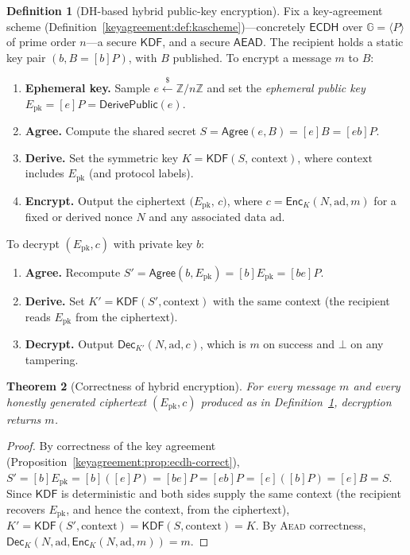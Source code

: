 \documentclass[11pt,a4paper]{article}
\newtheorem{theorem}{Theorem}[section]
\theoremstyle{definition}
\newtheorem{definition}[theorem]{Definition}
\theoremstyle{remark}
\newcommand{\Z}{\ensuremath{\mathbb{Z}}}
\newcommand{\G}{\ensuremath{\mathbb{G}}}
\begin{document}
\begin{definition}[DH-based hybrid public-key encryption]\label{keyagreement:def:hpke}
Fix a key-agreement scheme (Definition~\ref{keyagreement:def:kascheme})---concretely \(\mathsf{ECDH}\) over \(\G = \langle P\rangle\) of prime order \(n\)---a secure \(\mathsf{KDF}\), and a secure \(\mathsf{AEAD}\). The recipient holds a static key pair \((b, B = [b]P)\), with \(B\) published. To encrypt a message \(m\) to \(B\):
\begin{enumerate}
  \item \textbf{Ephemeral key.} Sample \(e \xleftarrow{\$} \Z/n\Z\) and set the \emph{ephemeral public key} \(E_{\mathrm{pk}} = [e]P = \mathsf{DerivePublic}(e)\).
  \item \textbf{Agree.} Compute the shared secret \(S = \mathsf{Agree}(e, B) = [e]B = [eb]P\).
  \item \textbf{Derive.} Set the symmetric key \(K = \mathsf{KDF}(S, \,\mathrm{context})\), where \(\mathrm{context}\) includes \(E_{\mathrm{pk}}\) (and protocol labels).
  \item \textbf{Encrypt.} Output the ciphertext \(\bigl(E_{\mathrm{pk}},\, c\bigr)\), where \(c = \mathsf{Enc}_K(N, \mathrm{ad}, m)\) for a fixed or derived nonce \(N\) and any associated data \(\mathrm{ad}\).
\end{enumerate}
To decrypt \((E_{\mathrm{pk}}, c)\) with private key \(b\):
\begin{enumerate}
  \item \textbf{Agree.} Recompute \(S' = \mathsf{Agree}(b, E_{\mathrm{pk}}) = [b]E_{\mathrm{pk}} = [be]P\).
  \item \textbf{Derive.} Set \(K' = \mathsf{KDF}(S', \mathrm{context})\) with the same context (the recipient reads \(E_{\mathrm{pk}}\) from the ciphertext).
  \item \textbf{Decrypt.} Output \(\mathsf{Dec}_{K'}(N, \mathrm{ad}, c)\), which is \(m\) on success and \(\bot\) on any tampering.
\end{enumerate}
\end{definition}

\begin{theorem}[Correctness of hybrid encryption]\label{keyagreement:thm:hpke-correct}
For every message \(m\) and every honestly generated ciphertext \((E_{\mathrm{pk}}, c)\) produced as in Definition~\ref{keyagreement:def:hpke}, decryption returns \(m\).
\end{theorem}

\begin{proof}
By correctness of the key agreement (Proposition~\ref{keyagreement:prop:ecdh-correct}), \(S' = [b]E_{\mathrm{pk}} = [b]([e]P) = [be]P = [eb]P = [e]([b]P) = [e]B = S\). Since \(\mathsf{KDF}\) is deterministic and both sides supply the same context (the recipient recovers \(E_{\mathrm{pk}}\), and hence the context, from the ciphertext), \(K' = \mathsf{KDF}(S', \mathrm{context}) = \mathsf{KDF}(S, \mathrm{context}) = K\). By \textsc{Aead} correctness, \(\mathsf{Dec}_{K}(N, \mathrm{ad}, \mathsf{Enc}_{K}(N, \mathrm{ad}, m)) = m\).
\end{proof}
\end{document}
